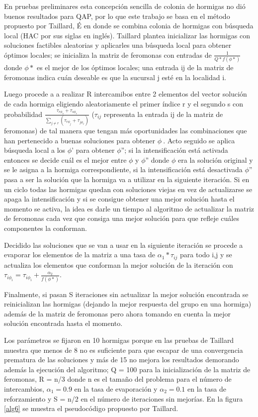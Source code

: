 \documentclass{ci5652}
\begin{document}
En pruebas preliminares esta concepción sencilla de colonia de hormigas no dió buenos resultados para QAP, por lo que este trabajo se basa en el método propuesto por Taillard, É en \cite{15} donde se combina colonia de hormigas con búsqueda local (HAC por sus siglas en inglés). Taillard plantea inicializar las hormigas con soluciones factibles aleatorias y aplicarles una búsqueda local para obtener óptimos locales; se inicializa la matriz de feromonas con entradas de $\frac{1}{Q*f(\phi*)}$ donde $\phi*$ es el mejor de los óptimos locales; una entrada ij de la matriz de feromonas indica cuán deseable es que la sucursal j esté en la localidad i. 

Luego procede a a realizar R intercamibos entre 2 elementos del vector solución de cada hormiga eligiendo aleatoriamente el primer índice r y el segundo s con probabilidad $\frac{\tau_{r\phi_s} + \tau_{s\phi_r}}{\sum_{j \neq r} (\tau_{r\phi_j} + \tau_{j\phi_r})}$ ($\tau_{ij}$ representa la entrada ij de la matriz de feromonas) de tal manera que tengan más oportunidades las combinaciones que han pertenecido a buenas soluciones para obtener $\phi~$. Acto seguido se aplica búsqueda local a los $\phi$' para obtener $\phi$''; si la intensificación está activada entonces se decide cuál es el mejor entre $\phi$ y $\phi$'' donde $\phi$ era la solución original y se le asigna a la hormiga correspondiente, si la intensificación está desactivada $\phi$'' pasa a ser la solución que la hormiga va a utilizar en la siguiente iteración. Si en un ciclo todas las hormigas quedan con soluciones viejas en vez de actualizarse se apaga la intensificación y si se consigue obtener una mejor solución hasta el momento se activa, la idea es darle un tiempo al algoritmo de actualizar la matriz de feromonas cada vez que consiga una mejor solución para que refleje cuáles componentes la conforman.

Decidido las soluciones que se van a usar en la siguiente iteración se procede a evaporar los elementos de la matriz a una tasa de $\alpha_1 * \tau_{ij}$ para todo i,j y se actualiza los elementos que conforman la mejor solución de la iteración con $ \tau_{i\phi_i} = \tau_{i\phi_i} + \frac{\alpha_2}{f(\phi*)}$.

Finalmente, si pasan S iteraciones sin actualizar la mejor solución encontrada se reinicializan las hormigas (dejando la mejor respuesta del grupo en una hormiga) además de la matriz de feromonas pero ahora tomando en cuenta la mejor solución encontrada hasta el momento.

Los parámetros se fijaron en 10 hormigas porque en las pruebas de Taillard muestra que menos de 8 no es suficiente para que escapar de una convergencia prematura de las soluciones y más de 15 no mejora los resultados demorando además la ejecución del algoritmo; Q = 100 para la inicialización de la matriz de feromonas, R = n/3 donde n es el tamaño del problema para el número de intercambios, $\alpha_1 = 0.9$ en la tasa de evaporación y $\alpha_2 = 0.1$ en la tasa de reforzamiento y S = n/2 en el número de iteraciones sin mejorías. En la figura \ref{alg6} se muestra el pseudocódigo propuesto por Taillard. 
\end{document}
